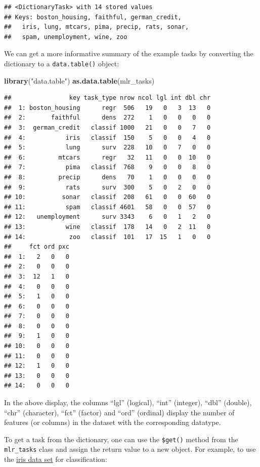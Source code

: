 \documentclass[]{article}
\newenvironment{Shaded}{\begin{snugshade}}{\end{snugshade}}
\newcommand{\KeywordTok}[1]{\textcolor[rgb]{0.13,0.29,0.53}{\textbf{#1}}}
\newcommand{\NormalTok}[1]{#1}
\newcommand{\StringTok}[1]{\textcolor[rgb]{0.31,0.60,0.02}{#1}}
\renewenvironment{Shaded} {\begin{snugshade}\small} {\end{snugshade}}
\begin{document}
\begin{verbatim}
## <DictionaryTask> with 14 stored values
## Keys: boston_housing, faithful, german_credit,
##   iris, lung, mtcars, pima, precip, rats, sonar,
##   spam, unemployment, wine, zoo
\end{verbatim}

We can get a more informative summary of the example tasks by converting the dictionary to a \texttt{data.table()} object:

\begin{Shaded}
\begin{Highlighting}[]
\KeywordTok{library}\NormalTok{(}\StringTok{"data.table"}\NormalTok{)}
\KeywordTok{as.data.table}\NormalTok{(mlr_tasks)}
\end{Highlighting}
\end{Shaded}

\begin{verbatim}
##                key task_type nrow ncol lgl int dbl chr
##  1: boston_housing      regr  506   19   0   3  13   0
##  2:       faithful      dens  272    1   0   0   0   0
##  3:  german_credit   classif 1000   21   0   0   7   0
##  4:           iris   classif  150    5   0   0   4   0
##  5:           lung      surv  228   10   0   7   0   0
##  6:         mtcars      regr   32   11   0   0  10   0
##  7:           pima   classif  768    9   0   0   8   0
##  8:         precip      dens   70    1   0   0   0   0
##  9:           rats      surv  300    5   0   2   0   0
## 10:          sonar   classif  208   61   0   0  60   0
## 11:           spam   classif 4601   58   0   0  57   0
## 12:   unemployment      surv 3343    6   0   1   2   0
## 13:           wine   classif  178   14   0   2  11   0
## 14:            zoo   classif  101   17  15   1   0   0
##     fct ord pxc
##  1:   2   0   0
##  2:   0   0   0
##  3:  12   1   0
##  4:   0   0   0
##  5:   1   0   0
##  6:   0   0   0
##  7:   0   0   0
##  8:   0   0   0
##  9:   1   0   0
## 10:   0   0   0
## 11:   0   0   0
## 12:   1   0   0
## 13:   0   0   0
## 14:   0   0   0
\end{verbatim}

In the above display, the columns ``lgl'' (logical), ``int'' (integer), ``dbl'' (double), ``chr'' (character), ``fct'' (factor) and ``ord'' (ordinal) display the number of features (or columns) in the dataset with the corresponding datatype.

To get a task from the dictionary, one can use the \texttt{\$get()} method from the \texttt{mlr\_tasks} class and assign the return value to a new object.
For example, to use the \href{https://en.wikipedia.org/wiki/Iris_flower_data_set}{iris data set} for classification:
\end{document}
